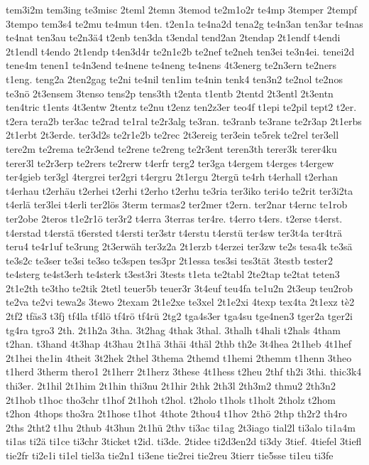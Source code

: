 {tem3i2m
tem3ing
te3misc
2teml
2temn
3temod
te2m1o2r
te4mp
3temper
2tempf
3tempo
tem3s4
te2mu
te4mun
t4en.
t2en1a
te4na2d
tena2g
te4n3an
ten3ar
te4nas
te4nat
ten3au
te2n3ä4
t2enb
ten3da
t3endal
tend2an
2tendap
2t1endf
t4endi
2t1endl
t4endo
2t1endp
t4en3d4r
te2n1e2b
te2nef
te2neh
ten3ei
te3n4ei.
tenei2d
tene4m
tenen1
te4n3end
te4nene
te4neng
te4nens
4t3energ
te2n3ern
te2ners
t1eng.
teng2a
2ten2gag
te2ni
te4nil
ten1im
te4nin
tenk4
ten3n2
te2nol
te2nos
te3nö
2t3ensem
3tenso
tens2p
tens3th
t2enta
t1entb
2tentd
2t3entl
2t3entn
ten4tric
t1ents
4t3entw
2tentz
te2nu
t2enz
ten2z3er
teo4f
t1epi
te2pil
tept2
t2er.
t2era
tera2b
ter3ac
te2rad
te1ral
te2r3alg
te3ran.
te3ranb
te3rane
te2r3ap
2t1erbs
2t1erbt
2t3erde.
ter3d2s
te2r1e2b
te2rec
2t3ereig
ter3ein
te5rek
te2rel
ter3ell
tere2m
te2rema
te2r3end
te2rene
te2reng
te2r3ent
teren3th
terer3k
terer4ku
terer3l
te2r3erp
te2rers
te2rerw
t4erfr
terg2
ter3ga
t4ergem
t4erges
t4ergew
ter4gieb
ter3gl
4tergrei
ter2gri
t4ergru
2t1ergu
2tergü
te4rh
t4erhall
t2erhan
t4erhau
t2erhäu
t2erhei
t2erhi
t2erho
t2erhu
te3ria
ter3iko
teri4o
te2rit
ter3i2ta
t4erlä
ter3lei
t4erli
ter2lös
3term
termas2
ter2mer
t2ern.
ter2nar
t4ernc
te1rob
ter2obe
2teros
t1e2r1ö
ter3r2
t4erra
3terras
ter4re.
t4erro
t4ers.
t2erse
t4erst.
t4erstad
t4erstä
t6ersted
t4ersti
ter3str
t4erstu
t4erstü
ter4sw
ter3t4a
ter4trä
teru4
te4r1uf
te3rung
2t3erwäh
ter3z2a
2t1erzb
t4erzei
ter3zw
te2s
tesa4k
te3sä
te3s2c
te3ser
te3si
te3so
te3spen
tes3pr
2t1essa
tes3si
tes3tät
3testb
tester2
te4sterg
te4st3erh
te4sterk
t3est3ri
3tests
t1eta
te2tabl
2te2tap
te2tat
teten3
2t1e2th
te3tho
te2tik
2tetl
teuer5b
teuer3r
3t4euf
teu4fa
te1u2n
2t3eup
teu2rob
te2va
te2vi
tewa2s
3tewo
2texam
2t1e2xe
te3xel
2t1e2xi
4texp
tex4ta
2t1exz
tè2
2tf2
tfäs3
t3fj
tf4la
tf4lö
tf4rö
tf4rü
2tg2
tga4s3er
tga4su
tge4nen3
tger2a
tger2i
tg4ra
tgro3
2th.
2t1h2a
3tha.
3t2hag
4thak
3thal.
3thalh
t4hali
t2hals
4tham
t2han.
t3hand
4t3hap
4t3hau
2t1hä
3thäi
4thäl
2thb
th2e
3t4hea
2t1heb
4t1hef
2t1hei
the1in
4theit
3t2hek
2thel
3thema
2themd
t1hemi
2themm
t1henn
3theo
t1herd
3therm
thero1
2t1herr
2t1herz
3these
4t1hess
t2heu
2thf
th2i
3thi.
thic3k4
thi3er.
2t1hil
2t1him
2t1hin
thi3nu
2t1hir
2thk
2th3l
2th3m2
thmu2
2th3n2
2t1hob
t1hoc
tho3chr
t1hof
2t1hoh
t2hol.
t2holo
t1hols
t1holt
2tholz
t2hom
t2hon
4thops
tho3ra
2t1hose
t1hot
4thote
2thou4
t1hov
2thö
2thp
th2r2
th4ro
2ths
2tht2
t1hu
2thub
4t3hun
2t1hü
2thv
ti3ac
ti1ag
2t3iago
tial2l
ti3alo
ti1a4m
ti1as
ti2ä
ti1ce
ti3chr
3ticket
t2id.
ti3de.
2tidee
ti2d3en2d
ti3dy
3tief.
4tiefel
3tiefl
tie2fr
ti2e1i
ti1el
tiel3a
tie2n1
ti3ene
tie2rei
tie2reu
3tierr
tie5sse
ti1eu
ti3fe
}
